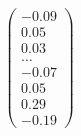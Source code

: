 \documentclass[preview]{standalone}
\begin{document}
\begin{align*}
\begin{pmatrix} -0.09 \\ 0.05 \\ 0.03 \\ \dots \\ -0.07 \\ 0.05 \\ 0.29 \\ -0.19 \end{pmatrix}
\end{align*}
\end{document}
